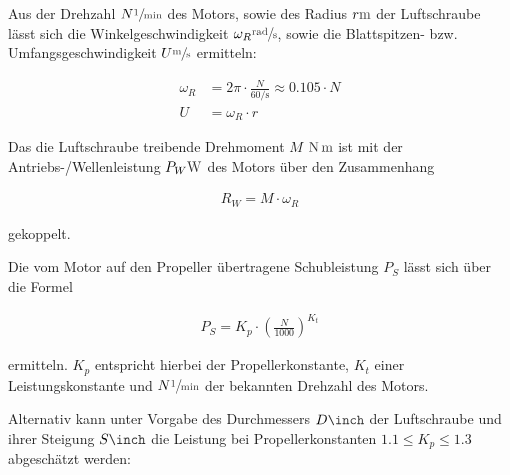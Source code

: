 

\bigbreak

Aus der Drehzahl 
$N \withunit{\per\minute}$ 
des Motors, sowie des Radius 
$r \withunit{\metre}$ 
der Luftschraube lässt sich die Winkelgeschwindigkeit 
$\omega_R \withunit{\radian\per\second}$, 
sowie die Blattspitzen- bzw. Umfangsgeschwindigkeit 
$U \withunit{\metre\per\second}$ 
ermitteln:

\begin{align}
	\omega_R &= 2\pi \cdot \frac{N}{60 \si{\per\second}} \approx 0.105 \cdot N \\
	U &= \omega_R \cdot r
\end{align}

\bigbreak

Das die Luftschraube treibende Drehmoment $M$ $\withunit{\newton\meter}$ ist mit der Antriebs-/Wellenleistung $P_W \withunit{\watt}$ des Motors über den Zusammenhang

\begin{align}
	R_W = M \cdot \omega_R
\end{align}

gekoppelt.

\bigbreak {}

Die vom Motor auf den Propeller übertragene Schubleistung $P_S$ lässt sich über die Formel

\begin{align}
	P_S = K_p \cdot \left(\frac{N}{1000}\right)^{K_t}
\end{align}

ermitteln. $K_p$ entspricht hierbei der Propellerkonstante, $K_t$ einer Leistungskonstante  und $N \withunit{\per\minute}$ der bekannten Drehzahl des Motors.

\bigbreak

Alternativ kann unter Vorgabe des Durchmessers $D \withunit{\inch}$ der Luftschraube und ihrer Steigung $S \withunit{\inch}$ die Leistung bei Propellerkonstanten $1.1 \leq K_p \leq 1.3$ abgeschätzt werden:

